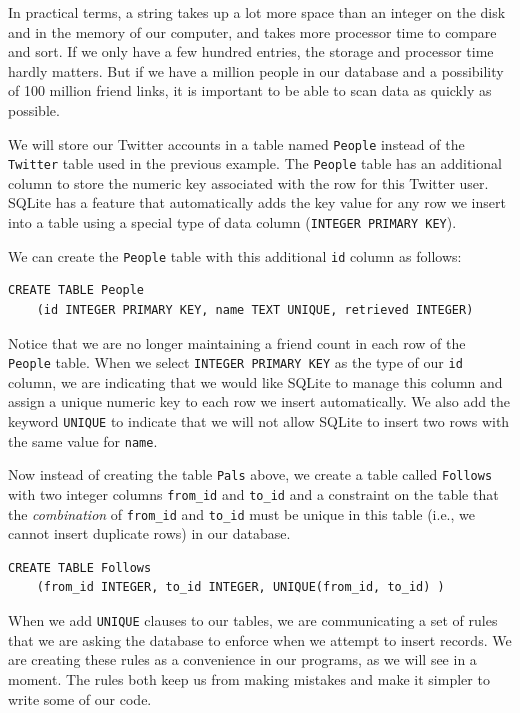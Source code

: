 In practical terms, a string takes up a lot more 
space than an integer on the disk
and in the memory of our computer, and takes more processor time
to compare and sort.  If we only have a few hundred entries, 
the storage and processor time hardly matters.  But if we have 
a million people in our database and a possibility of 100 million
friend links, it is important to be able to scan data as quickly
as possible.

We will store our Twitter accounts in a table named {\tt People}
instead of the {\tt Twitter} table used in the previous example.
The {\tt People} table has an additional column 
to store the numeric key associated with the 
row for this Twitter user.   
SQLite has a feature that automatically adds the key value
for any row we insert into a table using a special type of 
data column ({\tt INTEGER PRIMARY KEY}).

We can create the {\tt People} table with this additional 
{\tt id} column as follows:

\beforeverb
\begin{verbatim}
CREATE TABLE People 
    (id INTEGER PRIMARY KEY, name TEXT UNIQUE, retrieved INTEGER)
\end{verbatim}
\afterverb
%
Notice that we are no longer maintaining a friend count in each row
of the {\tt People} table.
When we select {\tt INTEGER PRIMARY KEY} as the type of our {\tt id} column,
we are indicating that we would like SQLite to manage this column and 
assign a unique numeric key to each row we insert automatically.
We also add the keyword {\tt UNIQUE} to indicate that we will not 
allow SQLite to insert two rows with the same value for {\tt name}.

Now instead of creating the table {\tt Pals} above, we create
a table called {\tt Follows} with two integer columns
\verb"from_id" and \verb"to_id" and a constraint on the table that
the \emph{combination} of \verb"from_id" and \verb"to_id" must be unique 
in this table (i.e., we cannot insert duplicate rows) in our database.

\beforeverb
\begin{verbatim}
CREATE TABLE Follows 
    (from_id INTEGER, to_id INTEGER, UNIQUE(from_id, to_id) )
\end{verbatim}
\afterverb
%
When we add {\tt UNIQUE} clauses to our tables, we are communicating a set
of rules that we are asking the database to enforce when we attempt to insert
records.   We are creating these rules as a convenience in our programs, as we
will see in a moment.  The rules both keep us from making mistakes and make
it simpler to write some of our code.

